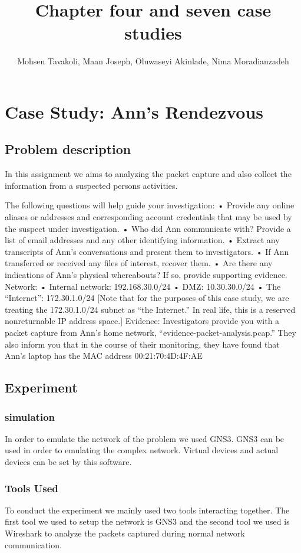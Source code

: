 \documentclass{article}
\title{Chapter four and seven case studies}
\author{Mohsen Tavakoli, Maan Joseph, Oluwaseyi Akinlade, Nima Moradianzadeh}
\begin{document}
\maketitle
\section{Case Study: Ann’s Rendezvous}
\subsection{Problem description}
In this assignment we aims to analyzing the packet capture and also collect the information from a suspected persons activities.
 
The following questions will help guide your investigation:
• Provide any online aliases or addresses and corresponding account credentials that
may be used by the suspect under investigation.
• Who did Ann communicate with? Provide a list of email addresses and any other
identifying information.
• Extract any transcripts of Ann’s conversations and present them to investigators.
• If Ann transferred or received any files of interest, recover them.
• Are there any indications of Ann’s physical whereabouts? If so, provide supporting
evidence.
Network:
• Internal network: 192.168.30.0/24
• DMZ: 10.30.30.0/24
• The “Internet”: 172.30.1.0/24 [Note that for the purposes of this case study, we are
treating the 172.30.1.0/24 subnet as “the Internet.” In real life, this is a reserved nonreturnable
IP address space.]
Evidence: Investigators provide you with a packet capture from Ann’s home network,
“evidence-packet-analysis.pcap.” They also inform you that in the course of their monitoring,
they have found that Ann’s laptop has the MAC address 00:21:70:4D:4F:AE
\subsection{Experiment}
\subsubsection{simulation}
In order to emulate the network of the problem we used GNS3. GNS3 can be used in order to emulating the complex network. Virtual devices and actual devices can be set by this software\cite{amyot2014system}.


\subsubsection{Tools Used}
To conduct the experiment we mainly used two tools interacting together. The first tool we used to setup the network is GNS3 and the second tool we used is Wireshark to analyze the packets captured during normal network communication.
\end{document}
